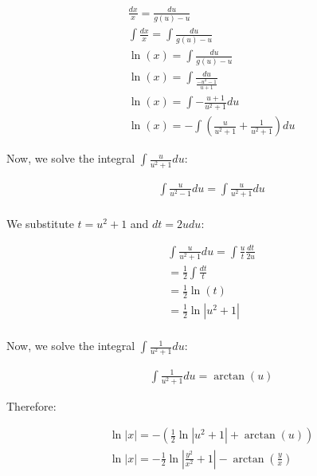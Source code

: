 \documentclass{article}
\begin{document}
\begin{singlespace}
        \begin{align*}
            &\frac{dx}{x} = \frac{du}{g(u)-u} \\
            &\int \frac{dx}{x} = \int \frac{du}{g(u)-u} \\
            &\ln(x) = \int \frac{du}{g(u)-u} \\
            &\ln(x) = \int \frac{du}{\frac{-u^{2}-1}{u+1}} \\
            &\ln(x) = \int -\frac{u+1}{u^{2}+1}du \\
            &\ln(x) = -\int \left( \frac{u}{u^{2}+1}+\frac{1}{u^{2}+1}\right)du
        \end{align*}
        \begin{flushleft}
            Now, we solve the integral $\int \frac{u}{u^{2}+1}du$:\\
        \end{flushleft}
        \begin{align*}
            &\int \frac{u}{u^{2}-1}du = \int \frac{u}{u^{2}+1}du \\
        \end{align*}
        \begin{center}
            We substitute $t=u^{2}+1$ and $dt=2udu$:
        \end{center}
        \begin{align*}
            & \int \frac{u}{u^{2}+1}du = \int \frac{u}{t}\frac{dt}{2u} \\
            &= \frac{1}{2}\int \frac{dt}{t} \\
            &= \frac{1}{2}\ln(t) \\
            &= \frac{1}{2}\ln|u^{2}+1| \\
        \end{align*}
        \begin{flushleft}
            Now, we solve the integral $\int \frac{1}{u^{2}+1}du$:\\
        \end{flushleft}
        \begin{align*}
            & \int \frac{1}{u^{2}+1}du=\arctan(u)
        \end{align*}
        \begin{flushleft}
            Therefore:
        \end{flushleft}
        \begin{align*}
            &\ln|x| = -\left(\frac{1}{2}\ln|u^{2}+1| + \arctan(u)\right) \\
            &\ln|x| = -\frac{1}{2}\ln|\frac{y^{2}}{x^{2}}+1|- \arctan\left(\frac{y}{x}\right) \\
        \end{align*}
    \end{singlespace}
\end{document}
